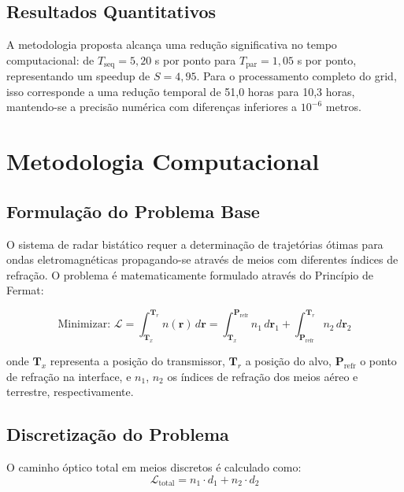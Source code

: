 \documentclass[12pt,a4paper]{article}
\begin{document}
\subsection{Resultados Quantitativos}
A metodologia proposta alcança uma redução significativa no tempo computacional: de $T_{\text{seq}} = 5,20$ s por ponto para $T_{\text{par}} = 1,05$ s por ponto, representando um speedup de $S = 4,95$. Para o processamento completo do grid, isso corresponde a uma redução temporal de 51,0 horas para 10,3 horas, mantendo-se a precisão numérica com diferenças inferiores a $10^{-6}$ metros.

\section{Metodologia Computacional}

\subsection{Formulação do Problema Base}

O sistema de radar bistático requer a determinação de trajetórias ótimas para ondas eletromagnéticas propagando-se através de meios com diferentes índices de refração. O problema é matematicamente formulado através do Princípio de Fermat:

\begin{equation}
\text{Minimizar: } \mathcal{L} = \int_{\mathbf{T}_x}^{\mathbf{T}_r} n(\mathbf{r}) \, d\mathbf{r} = \int_{\mathbf{T}_x}^{\mathbf{P}_{\text{refr}}} n_1 \, d\mathbf{r}_1 + \int_{\mathbf{P}_{\text{refr}}}^{\mathbf{T}_r} n_2 \, d\mathbf{r}_2
\end{equation}

onde $\mathbf{T}_x$ representa a posição do transmissor, $\mathbf{T}_r$ a posição do alvo, $\mathbf{P}_{\text{refr}}$ o ponto de refração na interface, e $n_1$, $n_2$ os índices de refração dos meios aéreo e terrestre, respectivamente.

\subsection{Discretização do Problema}

O caminho óptico total em meios discretos é calculado como:
\begin{equation}
\mathcal{L}_{\text{total}} = n_1 \cdot d_1 + n_2 \cdot d_2
\end{equation}
\end{document}
